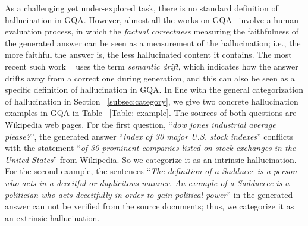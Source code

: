As a challenging yet under-explored task, there is no standard definition of hallucination in GQA. However, almost all the works on GQA~ involve a human evaluation process, in which the \textit{factual correctness} measuring the faithfulness of the generated answer can be seen as a measurement of the hallucination; i.e., the more faithful the answer is, the less hallucinated content it contains. The most recent such work ~ uses the term \textit{semantic drift}, which indicates how the answer drifts away from a correct one during generation, and this can also be seen as a specific definition of hallucination in GQA. 
In line with the general categorization of hallucination in Section ~\ref{subsec:category}, we give two concrete hallucination examples in GQA in Table ~\ref{Table: example}. The sources of both questions are Wikipedia web pages. For the first question, ``\textit{dow jones industrial average please?}'', the generated answer ``\textit{index of 30 major U.S. stock indexes}'' conflicts with the statement ``\textit{of 30 prominent companies listed on stock exchanges in the United States}'' from Wikipedia. So we categorize it as an {intrinsic hallucination}. For the second example, the sentences ``\textit{The definition of a Sadducee is a person who acts in a deceitful or duplicitous manner. An example of a Sadduceee is a politician who acts deceitfully in order to gain political power}'' in the generated answer can not be verified from the source documents; thus, we categorize it as an {extrinsic hallucination}.


